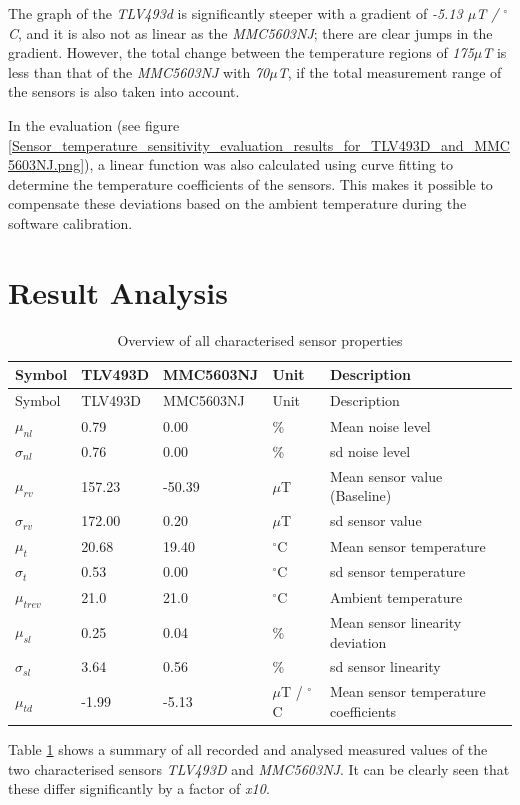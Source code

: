 The graph of the \emph{TLV493d} is significantly steeper with a gradient
of \emph{-5.13 \(\mu\)T / \(^{\circ}\)C}, and it is also not as linear
as the \emph{MMC5603NJ}; there are clear jumps in the gradient. However,
the total change between the temperature regions of \emph{175\(\mu\)T}
is less than that of the \emph{MMC5603NJ} with \emph{70\(\mu\)T}, if the
total measurement range of the sensors is also taken into account.

In the evaluation (see figure
\ref{Sensor_temperature_sensitivity_evaluation_results_for_TLV493D_and_MMC5603NJ.png}),
a linear function was also calculated using curve fitting to determine
the temperature coefficients of the sensors. This makes it possible to
compensate these deviations based on the ambient temperature during the
software calibration.

\hypertarget{result-analysis-1}{%
\section{Result Analysis}\label{result-analysis-1}}

\begin{longtable}[]{@{}lllll@{}}
\caption{Overview of all characterised sensor properties
\label{Overview_of_all_characterised_sensor_properties.csv}}\tabularnewline
\toprule
Symbol & TLV493D & MMC5603NJ & Unit & Description\tabularnewline
\midrule
\endfirsthead
\toprule
Symbol & TLV493D & MMC5603NJ & Unit & Description\tabularnewline
\midrule
\endhead
\(\mu_{nl}\) & 0.79 & 0.00 & \% & Mean noise level\tabularnewline
\(\sigma_{nl}\) & 0.76 & 0.00 & \% & \gls{sd} noise level\tabularnewline
\(\mu_{rv}\) & 157.23 & -50.39 & \(\mu\)T & Mean sensor value
(Baseline)\tabularnewline
\(\sigma_{rv}\) & 172.00 & 0.20 & \(\mu\)T & \gls{sd} sensor
value\tabularnewline
\(\mu_{t}\) & 20.68 & 19.40 & \(^{\circ}\)C & Mean sensor
temperature\tabularnewline
\(\sigma_{t}\) & 0.53 & 0.00 & \(^{\circ}\)C & \gls{sd} sensor
temperature\tabularnewline
\(\mu_{trev}\) & 21.0 & 21.0 & \(^{\circ}\)C & Ambient
temperature\tabularnewline
\(\mu_{sl}\) & 0.25 & 0.04 & \% & Mean sensor linearity
deviation\tabularnewline
\(\sigma_{sl}\) & 3.64 & 0.56 & \% & \gls{sd} sensor
linearity\tabularnewline
\(\mu_{td}\) & -1.99 & -5.13 & \(\mu\)T / \(^{\circ}\)C & Mean sensor
temperature coefficients\tabularnewline
\bottomrule
\end{longtable}

Table \ref{Overview_of_all_characterised_sensor_properties.csv} shows a
summary of all recorded and analysed measured values of the two
characterised sensors \emph{TLV493D} and \emph{MMC5603NJ}. It can be
clearly seen that these differ significantly by a factor of \emph{x10}.


